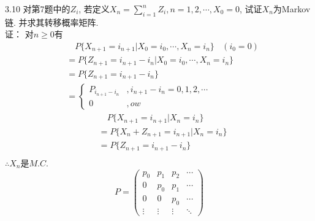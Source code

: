 3.10 对第7题中的$Z_i$, 若定义$X_n = \sum\limits^n_{i=1}Z_i, n = 1, 2, \cdots, X_0 = 0$, 试证$X_n$为Markov链. 并求其转移概率矩阵.\\
证：
对$n \geqslant 0$有\\
\[
\begin{split}
& \quad P\{X_{n+1} = i_{n+1} | X_0 = i_0, \cdots, X_n = i_n\}~~~~(i_0 = 0)\\
& = P\{Z_{n+1} = i_{n+1} - i_n | X_0 = i_0, \cdots, X_n = i_n\}\\
& = P\{Z_{n+1} = i_{n+1} - i_n\}\\
& = 
\begin{cases}
P_{i_{n+1}-i_n} &, i_{n+1} - i_n = 0,1,2,\cdots\\
0 &, ow
\end{cases}
\end{split}
\]
\[
\begin{split}
& \quad P\{X_{n+1} = i_{n+1} | X_n = i_n\}\\
& = P\{X_{n} + Z_{n+1} = i_{n+1} | X_n = i_n\}\\
& = P\{Z_{n+1} = i_{n+1} - i_n\}\\
\end{split}
\]
$\therefore X_n $是$M.C.$\\
\[
P = 
\begin{pmatrix}
p_0 & p_1 & p_2 & \cdots \\
0	& p_0 & p_1 & \cdots \\
0	& 0	  & p_0 & \cdots \\
\vdots & \vdots & \vdots & \ddots
\end{pmatrix}
\]


